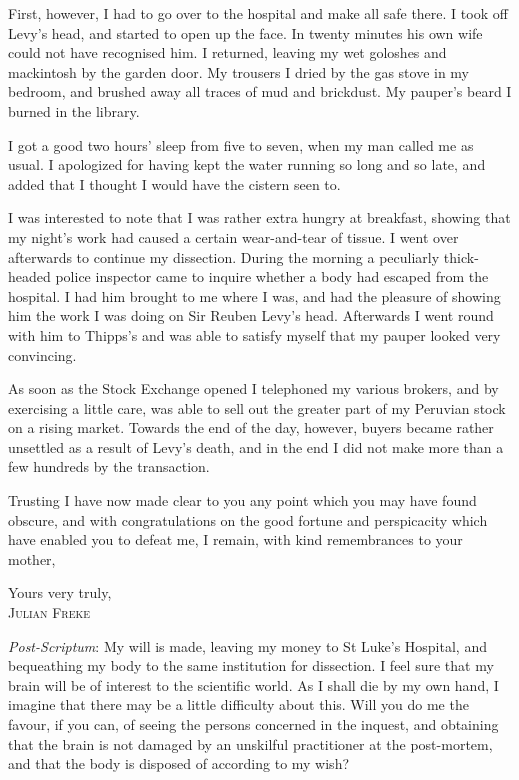 First, however, I had to go over to the hospital and make all safe there. I took off Levy’s head, and started to open up the face. In twenty minutes his own wife could not have recognised him. I returned, leaving my wet goloshes and mackintosh by the garden door. My trousers I dried by the gas stove in my bedroom, and brushed away all traces of mud and brickdust. My pauper’s beard I burned in the library.

I got a good two hours’ sleep from five to seven, when my man called me as usual. I apologized for having kept the water running so long and so late, and added that I thought I would have the cistern seen to.

I was interested to note that I was rather extra hungry at breakfast, showing that my night’s work had caused a certain wear-and-tear of tissue. I went over afterwards to continue my dissection. During the morning a peculiarly thick-headed police inspector came to inquire whether a body had escaped from the hospital. I had him brought to me where I was, and had the pleasure of showing him the work I was doing on Sir Reuben Levy’s head. Afterwards I went round with him to Thipps’s and was able to satisfy myself that my pauper looked very convincing.

As soon as the Stock Exchange opened I telephoned my various brokers, and by exercising a little care, was able to sell out the greater part of my Peruvian stock on a rising market. Towards the end of the day, however, buyers became rather unsettled as a result of Levy’s death, and in the end I did not make more than a few hundreds by the transaction.

Trusting I have now made clear to you any point which you may have found obscure, and with congratulations on the good fortune and perspicacity which have enabled you to defeat me, I remain, with kind remembrances to your mother,

\begin{flushright}
Yours very truly,\\
\textsc{Julian Freke}
\end{flushright}

\textit{Post-Scriptum}: My will is made, leaving my money to St Luke’s Hospital, and bequeathing my body to the same institution for dissection. I feel sure that my brain will be of interest to the scientific world. As I shall die by my own hand, I imagine that there may be a little difficulty about this. Will you do me the favour, if you can, of seeing the persons concerned in the inquest, and obtaining that the brain is not damaged by an unskilful practitioner at the post-mortem, and that the body is disposed of according to my wish?

